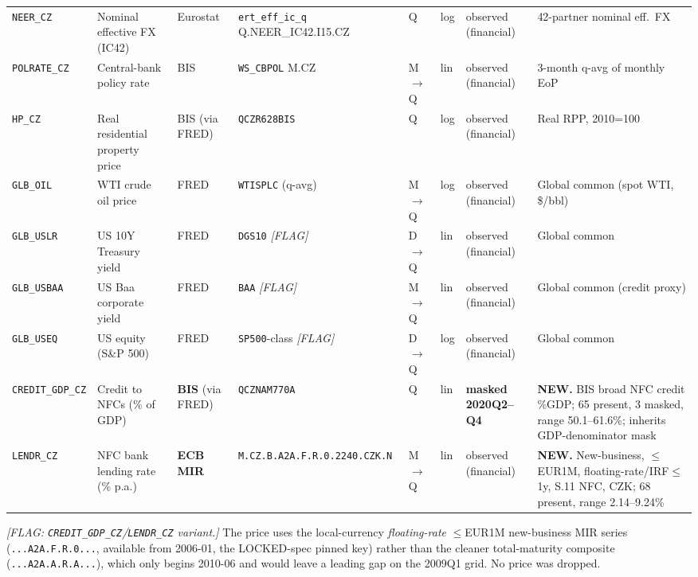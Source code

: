 {\begin{longtable}{@{}p{2.0cm}p{2.7cm}p{1.4cm}p{2.8cm}p{0.7cm}p{0.85cm}p{1.5cm}p{2.3cm}@{}}
\texttt{NEER\_CZ}   & Nominal effective FX (IC42)   & Eurostat & \texttt{ert\_eff\_ic\_q} Q.NEER\_IC42.I15.CZ            & Q & log & observed (financial) & 42-partner nominal eff.\ FX \\
\texttt{POLRATE\_CZ}& Central-bank policy rate      & BIS & \texttt{WS\_CBPOL} M.CZ                                 & M$\to$Q & lin & observed (financial) & 3-month q-avg of monthly EoP \\
\texttt{HP\_CZ}     & Real residential property price & BIS (via FRED) & \texttt{QCZR628BIS}                          & Q & log & observed (financial) & Real RPP, 2010=100 \\
\texttt{GLB\_OIL}   & WTI crude oil price           & FRED & \texttt{WTISPLC} (q-avg)                               & M$\to$Q & log & observed (financial) & Global common (spot WTI, \$/bbl) \\
\texttt{GLB\_USLR}  & US 10Y Treasury yield         & FRED & \texttt{DGS10} \textit{[FLAG]}                          & D$\to$Q & lin & observed (financial) & Global common \\
\texttt{GLB\_USBAA} & US Baa corporate yield        & FRED & \texttt{BAA} \textit{[FLAG]}                            & M$\to$Q & lin & observed (financial) & Global common (credit proxy) \\
\texttt{GLB\_USEQ}  & US equity (S\&P 500)          & FRED & \texttt{SP500}-class \textit{[FLAG]}                    & D$\to$Q & log & observed (financial) & Global common \\
\texttt{CREDIT\_GDP\_CZ} & Credit to NFCs (\% of GDP) & \textbf{BIS} (via FRED) & \texttt{QCZNAM770A}                       & Q & lin & \textbf{masked 2020Q2--Q4} & \textbf{NEW.} BIS broad NFC credit \%GDP; 65 present, 3 masked, range 50.1--61.6\%; inherits GDP-denominator mask \\
\texttt{LENDR\_CZ}  & NFC bank lending rate (\% p.a.) & \textbf{ECB MIR} & \texttt{M.\allowbreak CZ.\allowbreak B.\allowbreak A2A.\allowbreak F.\allowbreak R.0.2240.\allowbreak CZK.\allowbreak N}                 & M$\to$Q & lin & observed (financial) & \textbf{NEW.} New-business, $\le$EUR1M, floating-rate/IRF$\le$1y, S.11 NFC, CZK; 68 present, range 2.14--9.24\% \\
\end{longtable}}

\noindent\textit{[FLAG: \texttt{CREDIT\_GDP\_CZ}/\texttt{LENDR\_CZ} variant.]}
The price uses the local-currency \emph{floating-rate} $\le$EUR1M
new-business MIR series (\texttt{...\allowbreak A2A.\allowbreak F.\allowbreak R.0...}, available from 2006-01,
the LOCKED-spec pinned key) rather than the cleaner total-maturity
composite (\texttt{...\allowbreak A2A.\allowbreak A.\allowbreak R.\allowbreak A...}), which only begins 2010-06 and would
leave a leading gap on the 2009Q1 grid.  No price was dropped.

